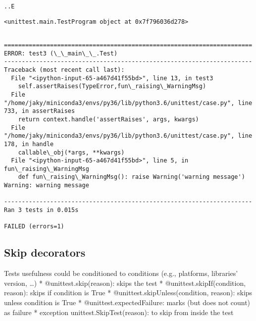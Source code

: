 \documentclass[11pt]{article}
\begin{document}
    \begin{Verbatim}[commandchars=\\\{\}]
..E
    \end{Verbatim}

    \begin{Verbatim}[commandchars=\\\{\}]
<unittest.main.TestProgram object at 0x7f796036d278>
    \end{Verbatim}

    \begin{Verbatim}[commandchars=\\\{\}]

======================================================================
ERROR: test3 (\_\_main\_\_.Test)
----------------------------------------------------------------------
Traceback (most recent call last):
  File "<ipython-input-65-a467d41f55bd>", line 13, in test3
    self.assertRaises(TypeError,fun\_raising\_WarningMsg)
  File "/home/jaky/miniconda3/envs/py36/lib/python3.6/unittest/case.py", line
733, in assertRaises
    return context.handle('assertRaises', args, kwargs)
  File "/home/jaky/miniconda3/envs/py36/lib/python3.6/unittest/case.py", line
178, in handle
    callable\_obj(*args, **kwargs)
  File "<ipython-input-65-a467d41f55bd>", line 5, in fun\_raising\_WarningMsg
    def fun\_raising\_WarningMsg(): raise Warning('warning message')
Warning: warning message

----------------------------------------------------------------------
Ran 3 tests in 0.015s

FAILED (errors=1)
    \end{Verbatim}

    \hypertarget{skip-decorators}{%
\subsection{Skip decorators}\label{skip-decorators}}

Tests usefulness could be conditioned to conditions (e.g., platforms,
libraries' version, \ldots) * @unittest.skip(reason): skips the test *
@unittest.skipIf(condition, reason): skips if condition is True *
@unittest.skipUnless(condition, reason): skips unless condition is True
* @unittest.expectedFailure: marks (but does not count) as failure *
exception unittest.SkipTest(reason): to skip from inside the test
\end{document}
